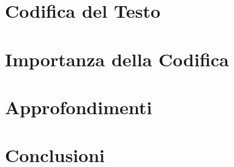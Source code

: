 \documentclass{beamer}
\begin{document}
\section{Codifica del Testo}


\section{Importanza della Codifica}


\section{Approfondimenti}


\section{Conclusioni}

\end{document}

